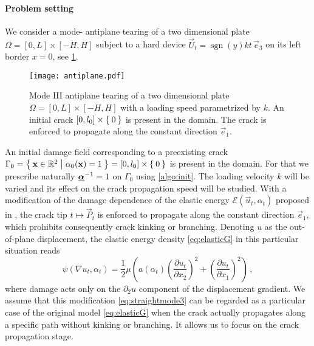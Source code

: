 \paragraph{Problem setting} We consider a mode- antiplane tearing of a two dimensional plate $\Omega=[0,L]\times[-H,H]$ subject to a hard device $\vec{U}_t=\operatorname{sgn}(y)kt\,\vec{e}_3$ on its left border $x=0$, see \cref{fig:antiplane}.
\begin{figure}[htbp]
\centering
\texttt{[image: antiplane.pdf]}
\caption{Mode III antiplane tearing of a two dimensional plate $\Omega=[0,L]\times[-H,H]$ with a loading speed parametrized by $k$. An initial crack $[0,l_0]\times\Set{0}$ is present in the domain. The crack is enforced to propagate along the constant direction $\vec{e}_1$.} \label{fig:antiplane}
\end{figure}
An initial damage field corresponding to a preexisting crack $\Gamma_0=\set{\vec{x}\in\mathbb{R}^2|\alpha_0(\vec{x})=1}=[0,l_0]\times\set{0}$ is present in the domain. For that we prescribe naturally $\dvec^{-1}=1$ on $\Gamma_0$ using \cref{algo:init}. The loading velocity $k$ will be varied and its effect on the crack propagation speed will be studied. With a modification of the damage dependence of the elastic energy $\mathcal{E}(\vec{u}_t,\alpha_t)$ proposed in \cite{Bourdin:2011}, the crack tip $t\mapsto\vec{P}_t$ is enforced to propagate along the constant direction $\vec{e}_1$, which prohibits consequently crack kinking or branching. Denoting $u$ as the out-of-plane displacement, the elastic energy density \eqref{eq:elasticG} in this particular situation reads
\begin{equation} \label{eq:straightmode3}
\psi(\nabla u_t,\alpha_t)=\frac{1}{2}\mu\left(a(\alpha_t)\left(\frac{\partial u_t}{\partial x_2}\right)^2+\left(\frac{\partial u_t}{\partial x_1}\right)^2\right)\,,
\end{equation}
where damage acts only on the $\partial_2 u$ component of the displacement gradient. We assume that this modification \eqref{eq:straightmode3} can be regarded as a particular case of the original model \eqref{eq:elasticG} when the crack actually propagates along a specific path without kinking or branching. It allows us to focus on the crack propagation stage.

